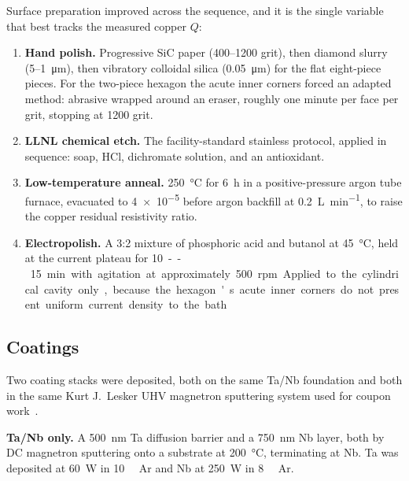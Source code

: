 Surface preparation improved across the sequence, and it is the single variable that best tracks the measured copper $Q$:

\begin{enumerate}
    \item \textbf{Hand polish.} Progressive SiC paper (400--1200 grit), then diamond slurry (5--\qty{1}{\micro\meter}), then vibratory colloidal silica (\qty{0.05}{\micro\meter}) for the flat eight-piece pieces. For the two-piece hexagon the acute inner corners forced an adapted method: abrasive wrapped around an eraser, roughly one minute per face per grit, stopping at 1200 grit.
    \item \textbf{LLNL chemical etch.} The facility-standard stainless protocol, applied in sequence: soap, HCl, dichromate solution, and an antioxidant.
    \item \textbf{Low-temperature anneal.} \qty{250}{\degreeCelsius} for \qty{6}{\hour} in a positive-pressure argon tube furnace, evacuated to \qty{4e-5}{\torr} before argon backfill at \qty{0.2}{\liter\per\minute}, to raise the copper residual resistivity ratio.
    \item \textbf{Electropolish.} A 3:2 mixture of phosphoric acid and butanol at \qty{45}{\degreeCelsius}, held at the current plateau for \qty{10}--\qty{15}{\minute} with agitation at approximately \qty{500}{rpm}. Applied to the cylindrical cavity only, because the hexagon's acute inner corners do not present uniform current density to the bath. 
\end{enumerate}

\subsection{Coatings}

Two coating stacks were deposited, both on the same Ta/Nb foundation and both in the same Kurt J.\ Lesker UHV magnetron sputtering system used for coupon work~\cite{withanageRapidNbSn2021}.

\textbf{Ta/Nb only.} A \qty{500}{\nano\meter} Ta diffusion barrier and a \qty{750}{\nano\meter} Nb layer, both by DC magnetron sputtering onto a substrate at \qty{200}{\degreeCelsius}, terminating at Nb. Ta was deposited at \qty{60}{\watt} in \qty{10}{\milli\torr} Ar and Nb at \qty{250}{\watt} in \qty{8}{\milli\torr} Ar. 

